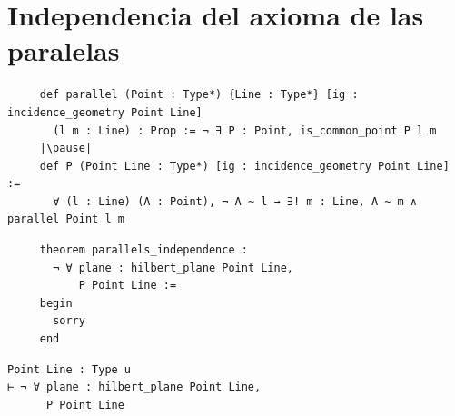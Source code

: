 \documentclass[t, aspectratio=169]{beamer}
\begin{document}

\section{Independencia del axioma de las paralelas}
\begin{frame}[fragile]
	\begin{lstlisting}
     def parallel (Point : Type*) {Line : Type*} [ig : incidence_geometry Point Line] 
       (l m : Line) : Prop := ¬ ∃ P : Point, is_common_point P l m
     |\pause|
     def P (Point Line : Type*) [ig : incidence_geometry Point Line] := 
       ∀ (l : Line) (A : Point), ¬ A ~ l → ∃! m : Line, A ~ m ∧ parallel Point l m
    \end{lstlisting}
	\pause
	\begin{multicols}{2}
		\begin{lstlisting}
     theorem parallels_independence :
       ¬ ∀ plane : hilbert_plane Point Line, 
           P Point Line := 
     begin
       sorry
     end
        \end{lstlisting}
		\columnbreak
		\pause
		\begin{lstlisting}
Point Line : Type u
⊢ ¬ ∀ plane : hilbert_plane Point Line, 
      P Point Line
        \end{lstlisting}
	\end{multicols}
\end{frame}
\end{document}
